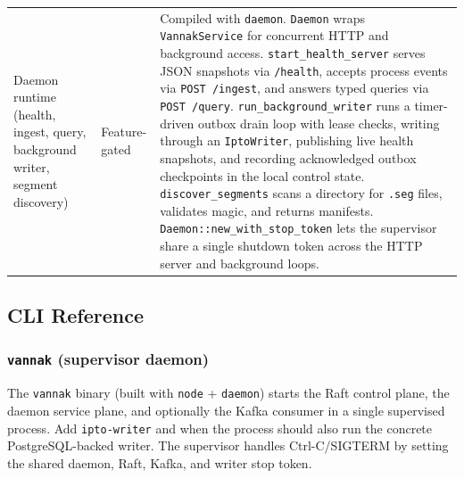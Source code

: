 \begin{longtable}{p{}p{}p{}}
Daemon runtime (health, ingest, query, background writer, segment discovery) & Feature-gated &
Compiled with \texttt{daemon}. \texttt{Daemon} wraps \texttt{VannakService}
for concurrent HTTP and background access. \texttt{start\_health\_server} serves
JSON snapshots via \texttt{/health}, accepts process events via
\texttt{POST /ingest}, and answers typed queries via \texttt{POST /query}.
\texttt{run\_background\_writer} runs a timer-driven outbox drain loop with
lease checks, writing through an \texttt{IptoWriter}, publishing live health
snapshots, and recording acknowledged outbox checkpoints in the local control
state. \texttt{discover\_segments} scans a directory for \texttt{.seg} files,
validates magic, and returns manifests. \texttt{Daemon::new\_with\_stop\_token}
lets the supervisor share a single shutdown token across the HTTP server and
background loops. \\
\end{longtable}

\subsection{CLI Reference}

\subsubsection{\texttt{vannak} (supervisor daemon)}

The \texttt{vannak} binary (built with \texttt{node} + \texttt{daemon}) starts
the Raft control plane, the daemon service plane, and optionally the Kafka
consumer in a single supervised process. Add \texttt{ipto-writer} and
 when the process should also run the concrete
PostgreSQL-backed \ipto{} writer. The supervisor handles Ctrl-C/SIGTERM by
setting the shared daemon, Raft, Kafka, and writer stop token.

